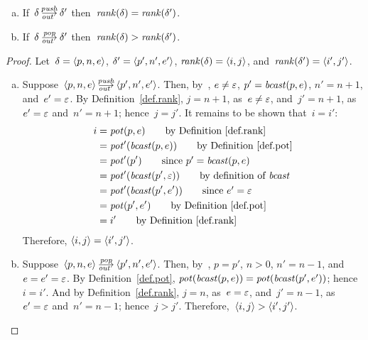 
\begin{lemma}\strut
  \label{lem.rank-out}
  \begin{enumerate}[(a)]
  \item\label{lem.rank-out-push} If~$\delta\outpush\delta'$
    then~$\operatorname{\mathit{rank}}(\delta)=\operatorname{\mathit{rank}}(\delta')$.
  \item\label{lem.rank-out-pop} If~$\delta\outpop\delta'$
    then~$\operatorname{\mathit{rank}}(\delta)>\operatorname{\mathit{rank}}(\delta')$.
  \end{enumerate}
\end{lemma}
\begin{proof}\strut
  Let~$\delta=\<p,n,e>$, $\delta'=\<p',n',e'>$,
  $\rank(\delta)=\<i,j>$, and~$\rank(\delta')=\<i',j'>$.
  \begin{enumerate}[(a)]
  \item Suppose~$\<p,n,e>\outpush\<p',n',e'>$.  Then, by~,
    $e\ne\varepsilon$, $p'=\operatorname{\mathit{bcast}}(p,e)$, $n'=n+1$, and~$e'=\varepsilon$.  By
    Definition~\ref{def.rank}, $j=n+1$, as~$e\ne\varepsilon$, and~$j'=n+1$,
    as~$e'=\varepsilon$ and~$n'=n+1$; hence~$j=j'$.
    It remains to be shown that~$i=i'$:
    \begin{align*}
      i&=\pot(p,e)
         \tag*{by Definition~\ref{def.rank}}\\
       &=\pot'(\bcast(p,e))
         \tag*{by Definition~\ref{def.pot}}\\
       &=\pot'(p')
         \tag*{since~$p'=\bcast(p,e)$}\\
       &=\pot'(\bcast(p',\nil))
         \tag*{by definition of~$\bcast$}\\
       &=\pot'(\bcast(p',e'))
         \tag*{since~$e'=\nil$}\\
       &=\pot(p',e')
         \tag*{by Definition~\ref{def.pot}}\\
       &=i'
         \tag*{by Definition~\ref{def.rank}}
    \end{align*}
    Therefore, $\<i,j>=\<i',j'>$.

  \item Suppose~$\<p,n,e>\outpop\<p',n',e'>$.  Then, by~, $p=p'$,
    $n>0$, $n'=n-1$, and~$e=e'=\varepsilon$.
    By Definition~\ref{def.pot}, $\operatorname{\mathit{pot}}(\operatorname{\mathit{bcast}}(p,e))=\operatorname{\mathit{pot}}(\operatorname{\mathit{bcast}}(p',e'))$;
    hence~$i=i'$.  And by Definition~\ref{def.rank}, $j=n$, as~$e=\varepsilon$,
    and~$j'=n-1$, as~$e'=\varepsilon$ and~$n'=n-1$; hence~$j>j'$.
    Therefore,~${\<i,j>}>{\<i',j'>}$.\qedhere
  \end{enumerate}
\end{proof}

